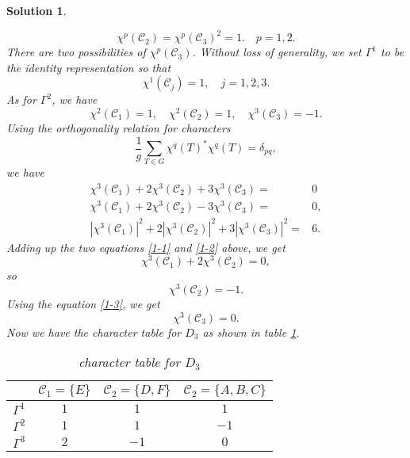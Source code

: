 \documentclass[UTF8,10pt,a4paper]{article}
\theoremstyle{Problem}
\theoremstyle{Solution}
\newtheorem*{sol}{Solution}
\begin{document}
\begin{sol}
\begin{enumerate}
        \begin{equation}
            \chi^p(\mathcal{C}_2)=\chi^p(\mathcal{C}_3)^2=1.\quad p=1,2.
        \end{equation}
        There are two possibilities of $\chi^p(\mathcal{C}_3)$. Without loss of generality, we set $\Gamma^1$ to be the identity representation so that
        \begin{equation}
            \chi^1(\mathcal{C}_j)=1,\quad j=1,2,3.
        \end{equation}
        As for $\Gamma^2$, we have
        \begin{equation}
            \chi^2(\mathcal{C}_1)=1,\quad\chi^2(\mathcal{C}_2)=1,\quad\chi^3(\mathcal{C}_3)=-1.
        \end{equation}
        Using the orthogonality relation for characters
        \begin{equation}
            \frac{1}{g}\sum_{T\in G}\chi^q(T)^*\chi^q(T)=\delta_{pq},
        \end{equation}
        we have
        \begin{align}
            \label{1-1}\chi^3(\mathcal{C}_1)+2\chi^3(\mathcal{C}_2)+3\chi^3(\mathcal{C}_3)=&0\\
            \label{1-2}\chi^3(\mathcal{C}_1)+2\chi^3(\mathcal{C}_2)-3\chi^3(\mathcal{C}_3)=&0,\\
            \label{1-3}|\chi^3(\mathcal{C}_1)|^2+2|\chi^3(\mathcal{C}_2)|^2+3|\chi^3(\mathcal{C}_3)|^2=&6.
        \end{align}
        Adding up the two equations \eqref{1-1} and \eqref{1-2} above, we get
        \begin{equation}
            \chi^3(\mathcal{C}_1)+2\chi^3(\mathcal{C}_2)=0,
        \end{equation}
        so
        \begin{equation}
            \chi^3(\mathcal{C}_2)=-1.
        \end{equation}
        Using the equation \eqref{1-3}, we get
        \begin{equation}
            \chi^3(\mathcal{C}_3)=0.
        \end{equation}
        Now we have the character table for $D_3$ as shown in table \ref{1-CT}.
        \begin{table}[h]
            \centering
            \caption{character table for $D_3$}
            \label{1-CT}
            \begin{tabular}{c|ccc}
             & $\mathcal{C}_1=\{E\}$ & $\mathcal{C}_2=\{D,F\}$ & $\mathcal{C}_2=\{A,B,C\}$ \\ \hline
            $\Gamma^1$ & $1$ & $1$ & $1$ \\
            $\Gamma^2$ & $1$ & $1$ & $-1$ \\
            $\Gamma^3$ & $2$ & $-1$ & $0$
            \end{tabular}
            \end{table}
    \end{enumerate}
\end{sol}
\end{document}
